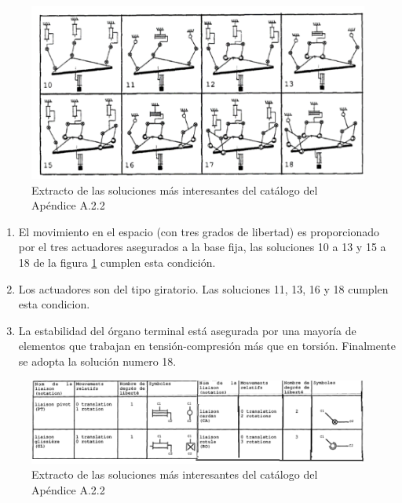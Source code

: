      \begin{figure}[htb]
        \centering
        \includegraphics[width=0.85\linewidth]{Main/Chapter3/Images3/3-3/soluciones-interesantes.png}
        \caption{Extracto de las soluciones más interesantes del catálogo del Apéndice A.2.2}
        \label{f:Cap3-3_soluciones_interesantes_catalogo}
    \end{figure}
    
    \begin{enumerate}
        \item El movimiento en el espacio (con tres grados de libertad) es proporcionado por el tres actuadores asegurados a la base fija, las soluciones 10 a 13 y 15 a 18 de la figura \ref{f:Cap3-3_soluciones_interesantes_catalogo} cumplen esta condición.
        \item Los actuadores son del tipo giratorio. Las soluciones 11, 13, 16 y 18 cumplen esta condicion.
        \item La estabilidad del órgano terminal está asegurada por una mayoría de elementos que trabajan en tensión-compresión más que en torsión. Finalmente se adopta la solución numero 18.
    \end{enumerate}
    
     \begin{figure}[htb]
        \centering
        \includegraphics[width=0.9\linewidth]{Main/Chapter4/Images4/juntas.png}
        \caption{Extracto de las soluciones más interesantes del catálogo del Apéndice A.2.2}
        \label{f:Cap3-3_soluciones_interesantes_catalogo_JUNTAS}
    \end{figure}
    
